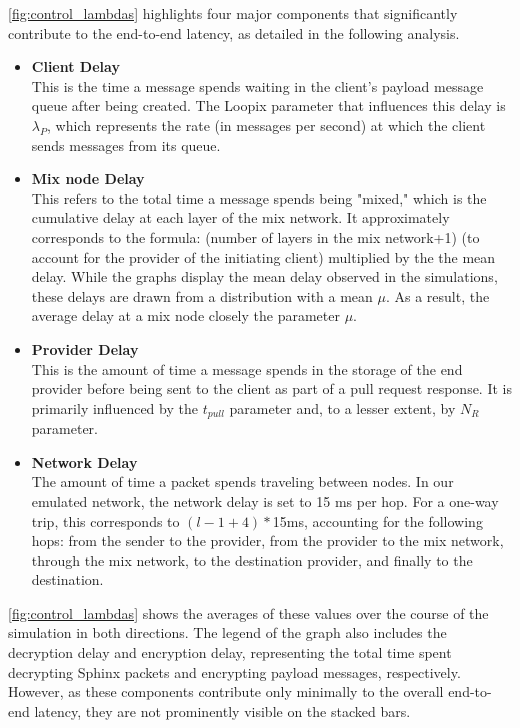 \documentclass[a4paper,11pt,oneside]{report}
\begin{document}
\autoref{fig:control_lambdas} highlights four major components that significantly contribute to the end-to-end latency, as detailed in the following analysis.
\clearpage
\begin{itemize}
    \item \textbf{Client Delay} \\
    This is the time a message spends waiting in the client’s payload message queue after being created. The Loopix parameter that influences this delay is \(\lambda_P\), which represents the rate (in messages per second) at which the client sends messages from its queue.
    \item \textbf{Mix node Delay} \\
    This refers to the total time a message spends being "mixed," which is the cumulative delay at each layer of the mix network. It approximately corresponds to the formula: (number of layers in the mix
    network+1) (to account for the provider of the initiating client) multiplied by the the mean delay.  While the graphs display the mean delay observed in the simulations, these delays are drawn from a distribution with a mean \(\mu\). As a result, the average delay at a mix node closely the parameter \(\mu\).
    \item \textbf{Provider Delay} \\
    This is the amount of time a message spends in the storage of the end provider before being sent to the client as part of a pull request response. It is primarily influenced by the \(t_{pull}\) parameter and, to a lesser extent, by \(N_R\) parameter.
    \item \textbf{Network Delay} \\
    The amount of time a packet spends traveling between nodes. In our emulated network, the network delay is set to 15 ms per hop. For a one-way trip, this corresponds to \((l - 1 + 4)*\)15ms, accounting for the following hops: from the sender to the provider, from the provider to the mix network, through the mix network, to the destination provider, and finally to the destination.
\end{itemize}

\autoref{fig:control_lambdas} shows the averages of these values over the course of the simulation in both directions. The legend of the graph also includes the decryption delay and encryption delay, representing the total time spent decrypting Sphinx packets and encrypting payload messages, respectively. However, as these components contribute only minimally to the overall end-to-end latency, they are not prominently visible on the stacked bars.
\end{document}
